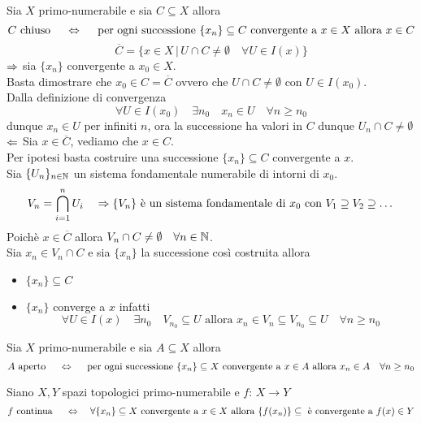 \begin{prop}Sia $X$ primo-numerabile e sia $C\subseteq X$ allora
$$ C \text{ chiuso } \quad \Leftrightarrow \quad \text{ per ogni successione } \{ x_n \} \subseteq C  \text{ convergente a } x \in X \text{ allora } x\in C $$
\proof $$\overline{C}=\{ x\in X \, \vert \, U \cap C \neq \emptyset \quad \forall U \in I(x)\}$$
$\Rightarrow$ sia $\{ x_n \} $ convergente a $x_0\in X$.\\
Basta dimostrare che $x_0 \in C = \overline{C}$ ovvero che $U \cap C \neq \emptyset $ con $U \in I(x_0)$.\\
Dalla definizione di convergenza
$$ \forall U \in I(x_0) \quad \exists n_0 \quad x_n \in U \quad \forall n \geq n_0$$
dunque $x_n\in U $ per infiniti $n$, ora la successione ha valori in $C$ dunque $U_n \cap C \neq \emptyset$\\
$\Leftarrow$ Sia $x\in \overline{C}$, vediamo che $x\in C$.\\
Per ipotesi basta costruire una successione $\{x_n \} \subseteq C$ convergente a $x$.\\
Sia $\displaystyle\{ U_n\}_{n \in \mathbb{N}}$ un sistema fondamentale numerabile di intorni di $x_0$.\\
$$V_n =\displaystyle \bigcap_{i=1}^n U_i \quad \Rightarrow \{ V_n \} \text{ \`e un sistema fondamentale di } x_0 \text{ con } V_1  \supseteq V_2 \supseteq \dots $$
Poich\`e $x\in \overline{C}$ allora $V_n \cap C \neq \emptyset \quad \forall n \in \mathbb{N}$.\\
Sia $x_n \in V_n \cap C$ e sia $\{ x_n\}$ la successione cos\`i costruita allora
\begin{itemize}
\item $\{ x_n \} \subseteq C $
\item $\{x_n \} $ converge a $x$ infatti
$$ \forall U \in I(x) \quad \exists n_0 \quad V_{n_0} \subseteq U \text{ allora } x_n \in V_n \subseteq V_{n_0} \subseteq U \quad \forall n \geq n_0$$
\end{itemize}
\endproof
\end{prop}
\begin{prop}Sia $X$ primo-numerabile e sia $A\subseteq X$ allora
$$ A \text{ aperto } \quad \Leftrightarrow \quad \text{ per ogni successione } \{ x_n \} \subseteq X  \text{ convergente a } x \in A \text{ allora } x_n\in A \quad \forall n \geq n_0 $$
\end{prop}
\begin{prop}
 Siano $X,Y$ spazi topologici primo-numerabile e $f:\, X \to Y$ 
$$ f \text{ continua } \quad \Leftrightarrow \quad \forall \{ x_n \} \subseteq X \text{ convergente a } x \in X \text{ allora } \{ f(x_n)\} \subseteq \text{ \`e convergente a } f(x) \in Y$$
\end{prop}
